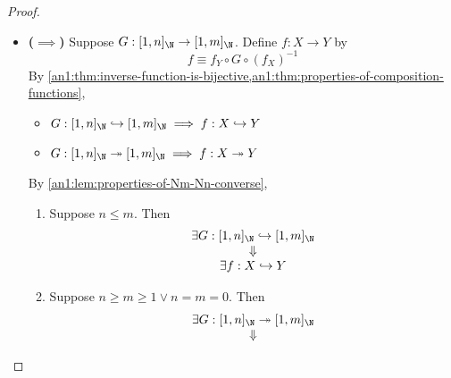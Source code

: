 \begin{proof}
\begin{itemize}
\begin{enumerate}[label=\textbf{(\Alph*)}]
\[\begin{array}{c}
                      n \geq m \geq 1 \lor n = m = 0
                    \end{array}
                  \]
            \item Suppose $\exists f: X \xrightarrow{\sim} Y$. Then
                  \[
                    \begin{array}{c}
                      \exists F: [1, n]_{\N} \xrightarrow{\sim} [1, m]_{\N} \\
                      \Downarrow                                            \\
                      n = m
                    \end{array}
                  \]
          \end{enumerate}
    \item \textbf{($\implies$)} Suppose $G: [1, n]_{\N} \to [1, m]_{\N}$. Define $f: X \to Y$ by
          \[
            f \equiv f_{Y} \circ G \circ (f_{X})^{-1}
          \]
          By \cref{an1:thm:inverse-function-is-bijective,an1:thm:properties-of-composition-functions},
          \begin{itemize}
            \item $G: [1, n]_{\N} \hookrightarrow [1, m]_{\N} \implies f: X \hookrightarrow Y$
            \item $G: [1, n]_{\N} \twoheadrightarrow [1, m]_{\N} \implies f: X \twoheadrightarrow Y$
          \end{itemize}
          By \cref{an1:lem:properties-of-Nm-Nn-converse},
          \begin{enumerate}[label=\textbf{(\Alph*)}]
            \item Suppose $n \leq m$. Then
                  \[
                    \begin{array}{c}
                      \exists G: [1, n]_{\N} \hookrightarrow [1, m]_{\N} \\
                      \Downarrow                                         \\
                      \exists f: X \hookrightarrow Y
                    \end{array}
                  \]
            \item Suppose $n \geq m \geq 1 \lor n = m = 0$. Then
                  \[
                    \begin{array}{c}
                      \exists G: [1, n]_{\N} \twoheadrightarrow [1, m]_{\N} \\
                      \Downarrow                                            \\

\end{array}\]
\end{enumerate}
\end{itemize}
\end{proof}
